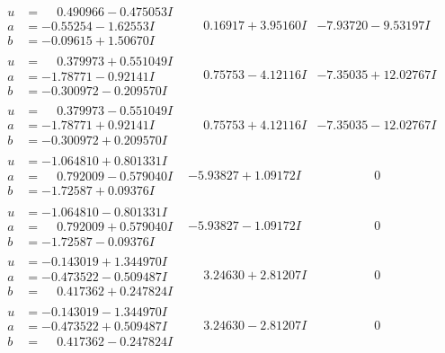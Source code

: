 \documentclass[1p]{elsarticle_modified}
\theoremstyle{definition}
\begin{document}
$$\begin{array}{c|c|c}
\begin{aligned}
u &= \phantom{-}0.490966 - 0.475053 I \\
a &= -0.55254 - 1.62553 I \\
b &= -0.09615 + 1.50670 I\end{aligned}
 & \phantom{-}0.16917 + 3.95160 I & -7.93720 - 9.53197 I \\ \hline\begin{aligned}
u &= \phantom{-}0.379973 + 0.551049 I \\
a &= -1.78771 - 0.92141 I \\
b &= -0.300972 - 0.209570 I\end{aligned}
 & \phantom{-}0.75753 - 4.12116 I & -7.35035 + 12.02767 I \\ \hline\begin{aligned}
u &= \phantom{-}0.379973 - 0.551049 I \\
a &= -1.78771 + 0.92141 I \\
b &= -0.300972 + 0.209570 I\end{aligned}
 & \phantom{-}0.75753 + 4.12116 I & -7.35035 - 12.02767 I \\ \hline\begin{aligned}
u &= -1.064810 + 0.801331 I \\
a &= \phantom{-}0.792009 - 0.579040 I \\
b &= -1.72587 + 0.09376 I\end{aligned}
 & -5.93827 + 1.09172 I & \phantom{-0.000000 } 0 \\ \hline\begin{aligned}
u &= -1.064810 - 0.801331 I \\
a &= \phantom{-}0.792009 + 0.579040 I \\
b &= -1.72587 - 0.09376 I\end{aligned}
 & -5.93827 - 1.09172 I & \phantom{-0.000000 } 0 \\ \hline\begin{aligned}
u &= -0.143019 + 1.344970 I \\
a &= -0.473522 - 0.509487 I \\
b &= \phantom{-}0.417362 + 0.247824 I\end{aligned}
 & \phantom{-}3.24630 + 2.81207 I & \phantom{-0.000000 } 0 \\ \hline\begin{aligned}
u &= -0.143019 - 1.344970 I \\
a &= -0.473522 + 0.509487 I \\
b &= \phantom{-}0.417362 - 0.247824 I\end{aligned}
 & \phantom{-}3.24630 - 2.81207 I & \phantom{-0.000000 } 0 \\ \hline\begin{aligned}

\end{aligned}
\end{array}$$
\end{document}
